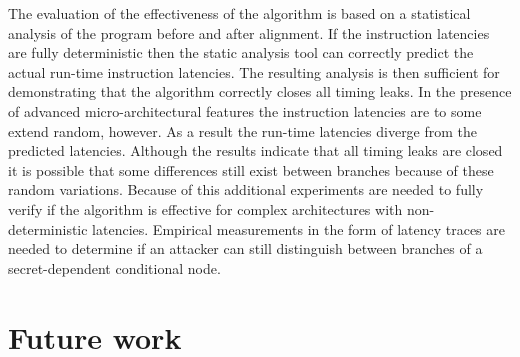 The evaluation of the effectiveness of the algorithm is based on a statistical analysis of the program before and after alignment. 
If the instruction latencies are fully deterministic then the static analysis tool can correctly predict the actual run-time instruction latencies. The resulting analysis 
is then sufficient for demonstrating that the algorithm correctly closes all timing leaks. 
In the presence of advanced micro-architectural features the instruction latencies are to some extend random, however. 
As a result the run-time latencies diverge from the predicted latencies. 
Although the results indicate that all timing leaks are closed it is possible that some differences still exist between branches because of these random variations. 
Because of this additional experiments are needed to fully verify if the algorithm is effective for complex architectures with non-deterministic latencies.
Empirical measurements in the form of latency traces are needed to determine if an attacker can still distinguish between branches of a secret-dependent conditional node. 


\section{Future work}
